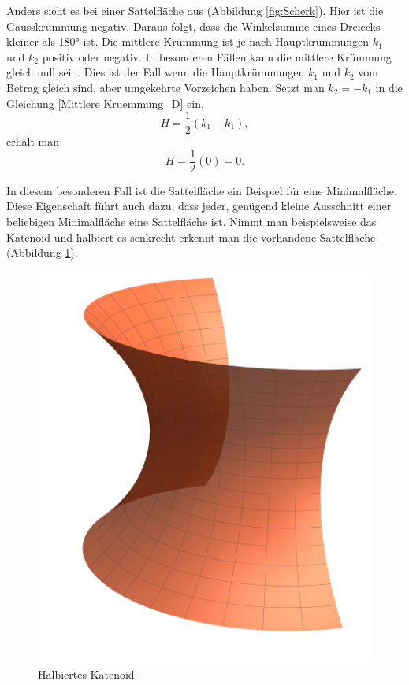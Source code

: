 \begin{refsection}
Anders sieht es bei einer Sattelfläche aus (Abbildung \ref{fig:Scherk}). Hier ist die Gausskrümmung negativ. Daraus folgt, dass die Winkelsumme eines Dreiecks kleiner als 180° ist. Die mittlere Krümmung ist je nach Hauptkrümmungen $k_1$ und $k_2$ positiv oder negativ. In besonderen Fällen kann die mittlere Krümmung gleich null sein. Dies ist der Fall wenn die Hauptkrümmungen $k_1$ und $k_2$ vom Betrag gleich sind, aber umgekehrte Vorzeichen haben. Setzt man $k_2 = - k_1$ in die Gleichung \ref{Mittlere Kruemmung_D} ein,
\begin{equation}
H=\frac{1}{2}(k_1-k_1),
\end{equation}
erhält man 
\begin{equation}
H=\frac{1}{2}(0)=0.
\end{equation}

In diesem besonderen Fall ist die Sattelfläche ein Beispiel für eine Minimalfläche. Diese Eigenschaft führt auch dazu, dass jeder, genügend kleine Ausschnitt einer beliebigen Minimalfläche eine Sattelfläche ist. Nimmt man beispielsweise das Katenoid und halbiert es senkrecht erkennt man die vorhandene Sattelfläche (Abbildung \ref{fig:CatenoidHalf}). 

\begin{figure}
  \centering
  \includegraphics[angle=270,scale=0.1]{minimal/CatenoidHalf.pdf}
  \caption{Halbiertes Katenoid} 
  \label{fig:CatenoidHalf}
\end{figure}


\end{refsection}
